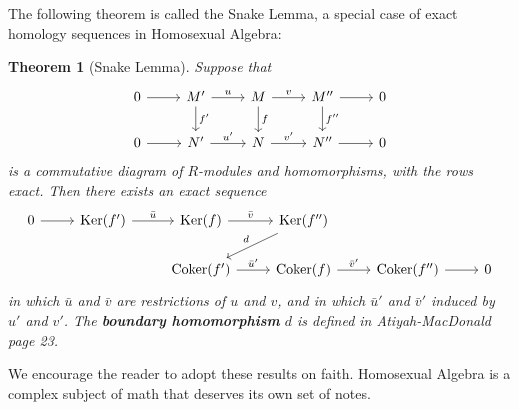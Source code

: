 \documentclass[11pt]{article}
\newtheorem{theorem}{Theorem}
\newcommand{\Ker}{\operatorname{Ker}}
\newcommand{\Coker}{\operatorname{Coker}}
\begin{document}
The following theorem is called the Snake Lemma, a special case of exact homology sequences in Homosexual Algebra: 

\begin{adjustwidth}{0.5cm}{}
  \begin{theorem}[Snake Lemma]
    Suppose that
    \[ \begin{tikzcd}
      0 \arrow[r] & M' \arrow[r, "u"] \arrow[d, "f'"] & M \arrow[r, "v"] \arrow[d, "f"] & M'' \arrow[r] \arrow[d, "f''"] & 0 \\
      0 \arrow[r] & N' \arrow[r, "u'"]                & N \arrow[r, "v'"]               & N'' \arrow[r]                  & 0
    \end{tikzcd} \]
    is a commutative diagram of $R$-modules and homomorphisms, with the rows exact. Then there exists an exact sequence
    \[ \begin{tikzcd}
      0 \arrow[r] & \Ker(f') \arrow[r, "\bar{u}"] & \Ker(f) \arrow[r, "\bar{v}"]     & \Ker(f'') \arrow[ld, "d"']      &                       &   \\
                  &                               & \Coker(f') \arrow[r, "\bar{u}'"] & \Coker(f) \arrow[r, "\bar{v}'"] & \Coker(f'') \arrow[r] & 0
    \end{tikzcd} \]
    in which $\bar{u}$ and $\bar{v}$ are restrictions of $u$ and $v$, and in which $\bar{u}'$ and $\bar{v}'$ induced by $u'$ and $v'$. The \textbf{boundary homomorphism} $d$ is defined in Atiyah-MacDonald page 23.
  \end{theorem}
\end{adjustwidth}

We encourage the reader to adopt these results on faith. Homosexual Algebra is a complex subject of math that deserves its own set of notes.

\end{document}

